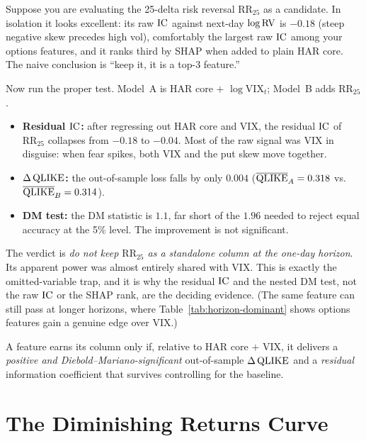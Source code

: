 \begin{workedexample}
Suppose you are evaluating the 25-delta risk reversal $\text{RR}_{25}$ as a candidate. In isolation it looks excellent: its raw $\operatorname{IC}$ against next-day $\log\operatorname{RV}$ is $-0.18$ (steep negative skew precedes high vol), comfortably the largest raw $\operatorname{IC}$ among your options features, and it ranks third by SHAP when added to plain HAR core. The naive conclusion is ``keep it, it is a top-3 feature.''

Now run the proper test. Model~A is HAR core $+$ $\log\text{VIX}_t$; Model~B adds $\text{RR}_{25}$.
\begin{itemize}[nosep]
  \item \textbf{Residual $\operatorname{IC}$:} after regressing out HAR core and VIX, the residual $\operatorname{IC}$ of $\text{RR}_{25}$ collapses from $-0.18$ to $-0.04$. Most of the raw signal was VIX in disguise: when fear spikes, both VIX and the put skew move together.
  \item \textbf{$\Delta\operatorname{QLIKE}$:} the out-of-sample loss falls by only $0.004$ ($\overline{\operatorname{QLIKE}}_A = 0.318$ vs.\ $\overline{\operatorname{QLIKE}}_B = 0.314$).
  \item \textbf{DM test:} the DM statistic is $1.1$, far short of the $1.96$ needed to reject equal accuracy at the 5\% level. The improvement is not significant.
\end{itemize}
The verdict is \emph{do not keep $\text{RR}_{25}$ as a standalone column at the one-day horizon}. Its apparent power was almost entirely shared with VIX. This is exactly the omitted-variable trap, and it is why the residual $\operatorname{IC}$ and the nested DM test, not the raw $\operatorname{IC}$ or the SHAP rank, are the deciding evidence. (The same feature can still pass at longer horizons, where Table~\ref{tab:horizon-dominant} shows options features gain a genuine edge over VIX.)
\end{workedexample}

\begin{keyidea}
A feature earns its column only if, relative to HAR core $+$ VIX, it delivers a \emph{positive and Diebold--Mariano-significant} out-of-sample $\Delta\operatorname{QLIKE}$ and a \emph{residual} information coefficient that survives controlling for the baseline.
\end{keyidea}


\section{The Diminishing Returns Curve}\label{sec:feat-diminishing}

